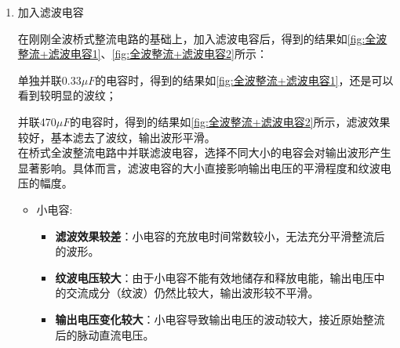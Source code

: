 \documentclass[dvipsnames, svgnames,a4paper,11pt]{article}
\begin{document}
\begin{enumerate}
				
				



			\item 加入滤波电容
			
				在刚刚全波桥式整流电路的基础上，加入滤波电容后，得到的结果如\cref{fig:全波整流+滤波电容1}、\cref{fig:全波整流+滤波电容2}所示：

				单独并联0.33$\mu F$的电容时，得到的结果如\cref{fig:全波整流+滤波电容1}，还是可以看到较明显的波纹；
				
				并联470$\mu F$的电容时，得到的结果如\cref{fig:全波整流+滤波电容2}所示，滤波效果较好，基本滤去了波纹，输出波形平滑。\\

				
				
				在桥式全波整流电路中并联滤波电容，选择不同大小的电容会对输出波形产生显著影响。具体而言，滤波电容的大小直接影响输出电压的平滑程度和纹波电压的幅度。

				\begin{itemize}
					\item 小电容:

						\begin{itemize}
							\item \textbf{滤波效果较差}：小电容的充放电时间常数较小，无法充分平滑整流后的波形。
							\item \textbf{纹波电压较大}：由于小电容不能有效地储存和释放电能，输出电压中的交流成分（纹波）仍然比较大，输出波形较不平滑。
							\item \textbf{输出电压变化较大}：小电容导致输出电压的波动较大，接近原始整流后的脉动直流电压。
						\end{itemize}


\end{itemize}
\end{enumerate}
\end{document}
